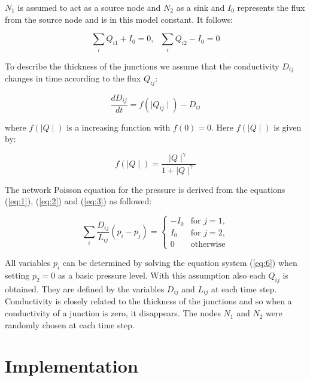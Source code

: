 \documentclass[11pt]{scrartcl}
\begin{document}
$N_1$ is assumed to act as a source node and $N_2$ as a sink and $I_0$ represents the flux from the source node and is in this model constant. It follows:

\begin{equation}
	\label{eq:3}
	\sum_{i} Q_{i1}+I_0=0, \,\,\,\, \sum_{i} Q_{i2}-I_0=0
\end{equation}

To describe the thickness of the junctions we assume that the conductivity $D_{ij}$ changes in time according to the flux $Q_{ij}$:

\begin{equation}
	\label{eq:4}
	\frac{dD_{ij}}{dt}=f\left(\mid Q_{ij} \mid \right)-D_{ij}
\end{equation}

where $f\left(\mid Q \mid \right)$ is a increasing function with $f(0)=0$. Here $f\left(\mid Q \mid \right)$ is given by:

\begin{equation}
	\label{eq:5}
	f\left(\mid Q \mid \right)=\frac{\mid Q \mid^\gamma }{1+\mid Q \mid^\gamma}
\end{equation}

The network Poisson equation for the pressure is derived from the equations (\ref{eq:1}), (\ref{eq:2}) and (\ref{eq:3}) as followed:

\begin{equation}
	\label{eq:6}
	\sum_{i} \frac{D_{ij}}{L_{ij}}\left(p_i-p_j\right)= \begin{cases}
										-I_0 & \mathrm{for}\,\, j=1,\\
										I_0 & \mathrm{for} \,\,j=2,\\
										0 & \mathrm{otherwise}
										\end{cases}
\end{equation}

All variables $p_i$ can be determined by solving the equation system (\ref{eq:6}) when setting $p_2=0$ as a basic pressure level. With this assumption also each $Q_{ij}$ is obtained. They are defined by the variables $D_{ij}$ and $L_{ij}$  at each time step. Conductivity is closely related to the thickness of the junctions and so when a conductivity of a junction is zero, it disappears. The nodes $N_1$ and $N_2$ were randomly chosen at each time step.

\section{Implementation}
\end{document}
